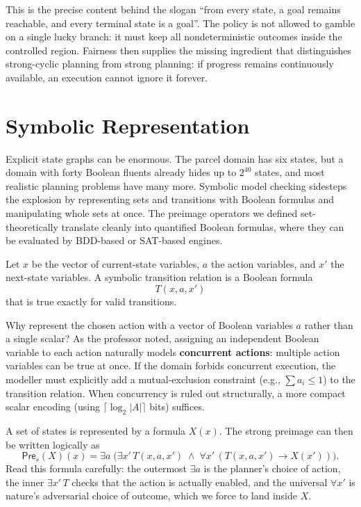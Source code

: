 This is the precise content behind the slogan ``from every state, a
goal remains reachable, and every terminal state is a goal''.  The
policy is not allowed to gamble on a single lucky branch: it must keep
all nondeterministic outcomes inside the controlled region.  Fairness
then supplies the missing ingredient that distinguishes strong-cyclic
planning from strong planning: if progress remains continuously
available, an execution cannot ignore it forever.


\section{Symbolic Representation}
\label{sec:symbolic-planning}

Explicit state graphs can be enormous.  The parcel domain has six
states, but a domain with forty Boolean fluents already hides up to
$2^{40}$ states, and most realistic planning problems have many more.
Symbolic model checking sidesteps the explosion by representing sets
and transitions with Boolean formulas and manipulating whole sets at
once.  The preimage operators we defined set-theoretically translate
cleanly into quantified Boolean formulas, where they can be evaluated by
BDD-based or SAT-based engines.

\begin{definition}
\label{def:symbolic-transition}
Let $x$ be the vector of current-state variables, $a$ the action
variables, and $x'$ the next-state variables.  A symbolic transition
relation is a Boolean formula
\[
  T(x,a,x')
\]
that is true exactly for valid transitions.
\end{definition}

Why represent the chosen action with a vector of Boolean variables $a$
rather than a single scalar?  As the professor noted, assigning an
independent Boolean variable to each action naturally models
\textbf{concurrent actions}: multiple action variables can be true at
once.  If the domain forbids concurrent execution, the modeller must
explicitly add a mutual-exclusion constraint (e.g., $\sum a_i \le 1$) to
the transition relation.  When concurrency is ruled out structurally, a
more compact scalar encoding (using $\lceil\log_2|A|\rceil$ bits)
suffices.

A set of states is represented by a formula $X(x)$.  The strong preimage
can then be written logically as
\[
  \mathsf{Pre}_s(X)(x)
  =
  \exists a\;
  \Big(
    \exists x'\,T(x,a,x')
    \;\wedge\;
    \forall x'\,(T(x,a,x')\rightarrow X(x'))
  \Big).
\]
Read this formula carefully: the outermost $\exists a$ is the planner's
choice of action, the inner $\exists x'\,T$ checks that the action is
actually enabled, and the universal $\forall x'$ is nature's adversarial
choice of outcome, which we force to land inside $X$.

